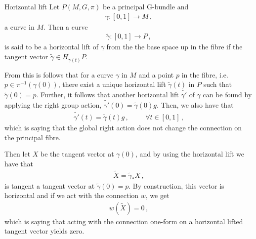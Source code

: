\medskip
\begin{mydef}{Horizontal lift}{}
Let $P(M,G,\pi)$ be a principal G-bundle and
\begin{align*}
    \gamma:[0,1]\rightarrow M\,,
\end{align*}
a curve in $M$. Then a curve 
\begin{align*}
    \tilde{\gamma}:[0,1]\rightarrow P\,,
\end{align*}
is said to be a horizontal lift of $\gamma$ from the the base space up in the fibre if the tangent vector $\tilde{\gamma}\in H_{\tilde{\gamma}(t)}P.$ 
\end{mydef}\noindent
From this is follows that for a curve $\gamma$ in $M$ and a point $p$ in the fibre, i.e. $p\in\pi^{-1}(\gamma(0))$, there exist a unique horizontal lift $\tilde{\gamma}(t)$ in $P$ such that $\tilde{\gamma}(0)=p$. Further, it follows that another horizontal lift $\tilde{\gamma'}$ of $\gamma$ can be found by applying the right group action, $\tilde{\gamma'}(0)=\tilde{\gamma}(0)g$. Then, we also have that
\begin{align}
    \tilde{\gamma'}(t)=\tilde{\gamma}(t)g\,,\hspace{1cm}\forall t\in [0,1]\,,
\end{align}
which is saying that the global right action does not change the connection on the principal fibre. 

Then let $X$ be the tangent vector at $\gamma(0)$, and by using the horizontal lift we have that 
\begin{align}
    \tilde{X}=\tilde{\gamma}_{*}X\,,
\end{align}
is tangent a tangent vector at $\tilde{\gamma}(0)=p$. By construction, this vector is horizontal and if we act with the connection $w$, we get
\begin{align}
    w(\tilde{X})=0\,,
\end{align}
which is saying that acting with the connection one-form on a horizontal lifted tangent vector yields zero.

